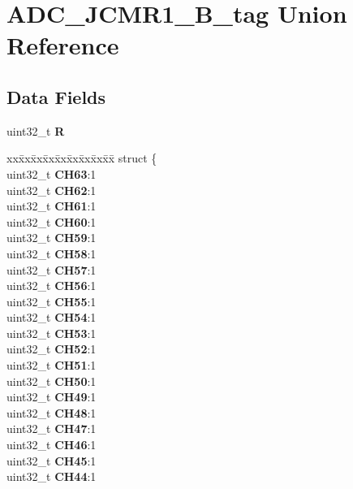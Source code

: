 \hypertarget{unionADC__JCMR1__32B__tag}{}\section{A\+D\+C\+\_\+\+J\+C\+M\+R1\+\_\+B\+\_\+tag Union Reference}
\label{unionADC__JCMR1__32B__tag}
\subsection*{Data Fields}
\begin{DoxyCompactItemize}
\item 
\mbox{\label{unionADC__JCMR1__32B__tag_a1d0e179412f73bd421facb670573da79}} 
uint32\+\_\+t {\bfseries R}
\item 
\mbox{\label{unionADC__JCMR1__32B__tag_ad1cce2133bc3dd7984bb80faf439a704}} 
\begin{tabbing}
xx\=xx\=xx\=xx\=xx\=xx\=xx\=xx\=xx\=\kill
struct \{\\
\>uint32\_t {\bfseries CH63}:1\\
\>uint32\_t {\bfseries CH62}:1\\
\>uint32\_t {\bfseries CH61}:1\\
\>uint32\_t {\bfseries CH60}:1\\
\>uint32\_t {\bfseries CH59}:1\\
\>uint32\_t {\bfseries CH58}:1\\
\>uint32\_t {\bfseries CH57}:1\\
\>uint32\_t {\bfseries CH56}:1\\
\>uint32\_t {\bfseries CH55}:1\\
\>uint32\_t {\bfseries CH54}:1\\
\>uint32\_t {\bfseries CH53}:1\\
\>uint32\_t {\bfseries CH52}:1\\
\>uint32\_t {\bfseries CH51}:1\\
\>uint32\_t {\bfseries CH50}:1\\
\>uint32\_t {\bfseries CH49}:1\\
\>uint32\_t {\bfseries CH48}:1\\
\>uint32\_t {\bfseries CH47}:1\\
\>uint32\_t {\bfseries CH46}:1\\
\>uint32\_t {\bfseries CH45}:1\\
\>uint32\_t {\bfseries CH44}:1\\

\end{tabbing}
\end{DoxyCompactItemize}
